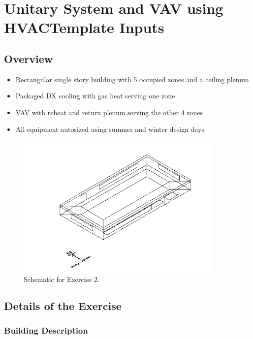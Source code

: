 \section{Unitary System and VAV using HVACTemplate Inputs}\label{unitary-system-and-vav-using-hvactemplate-inputs}

\subsection{Overview}\label{overview-000}

\begin{itemize}
\item
  Rectangular single story building with 5 occupied zones and a ceiling plenum
\item
  Packaged DX cooling with gas heat serving one zone
\item
  VAV with reheat and return plenum serving the other 4 zones
\item
  All equipment autosized using summer and winter design days
\end{itemize}

\begin{figure}[hbtp] %
\centering
\includegraphics[width=0.9\textwidth, height=0.9\textheight, keepaspectratio=true]{media/image020.png}
\caption{Schematic for Exercise 2. \protect \label{fig:schematic-for-exercise-2.}}
\end{figure}

\subsection{Details of the Exercise}\label{details-of-the-exercise-000}

\subsubsection{Building Description}\label{building-description}

